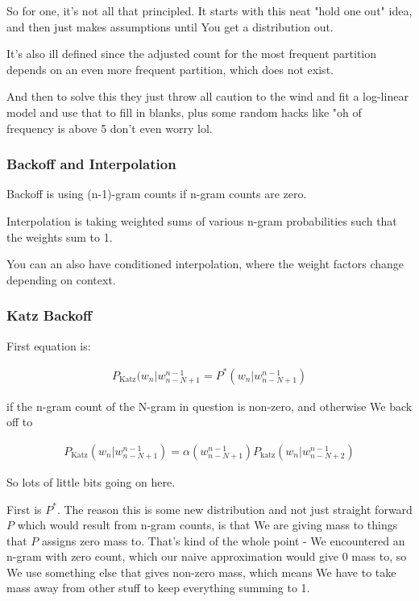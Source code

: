 \documentclass{article}
\begin{document}
			So for one, it's not all that principled. It starts with this neat "hold one out" idea, and then just makes assumptions until You get a distribution out.
			
			It's also ill defined since the adjusted count for the most frequent partition depends on an even more frequent partition, which does not exist.
			
			And then to solve this they just throw all caution to the wind and fit a log-linear model and use that to fill in blanks, plus some random hacks like "oh of frequency is above 5 don't even worry lol.
			
		
		\subsubsection{Backoff and Interpolation}
		
			Backoff is using (n-1)-gram counts if n-gram counts are zero.
			
			Interpolation is taking weighted sums of various n-gram probabilities such that the weights sum to 1.
			
			You can an also have conditioned interpolation, where the weight factors change depending on context.
			
		\subsubsection{Katz Backoff}
		
			First equation is:
			
			\begin{align}
				P_{\text{Katz}}(w_n|w^{n-1}_{n-N+1} = P^*(w_n|w^{n-1}_{n-N+1})
			\end{align}
			
			if the n-gram count of the N-gram in question is non-zero, and otherwise We back off to
			
			\begin{align}
				P_{\text{Katz}}(w_n|w^{n-1}_{n-N+1}) = \alpha(w^{n-1}_{n-N+1})P_{\text{katz}} (w_n|w^{n-1}_{n-N+2})
			\end{align}
			
			So lots of little bits going on here.
			
			First is $P^*$. The reason this is some new distribution and not just straight forward $P$ which would result from n-gram counts, is that We are giving mass to things that $P$ assigns zero mass to. That's kind of the whole point - We encountered an n-gram with zero count, which our naive approximation would give 0 mass to, so We use something else that gives non-zero mass, which means We have to take mass away from other stuff to keep everything summing to 1.
			
\end{document}
